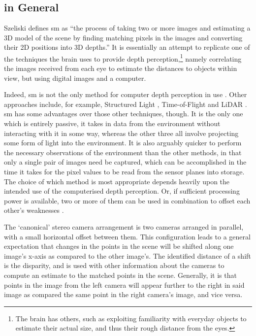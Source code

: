\section{}

\subsection{\label{subsec:smgeneral} in General}
Szeliski defines \gls{sm} \cite[p. 469]{Szeliski2011} as ``the process of taking two or more images and estimating a 3D model of the scene by finding matching pixels in the images and converting their 2D positions into 3D depths.''  It is essentially an attempt to replicate one of the techniques the brain uses to provide depth perception,\footnote{The brain has others, such as exploiting familiarity with everyday objects to estimate their actual size, and thus their rough distance from the eyes.} namely correlating the images received from each eye to estimate the distances to objects within view, but using digital images and a computer.

Indeed, \gls{sm} is not the only method for computer depth perception in use \cite{Sinha2020}.  Other approaches include, for example, Structured Light \cite{Giancola2018}, Time-of-Flight \cite{Hansard2013} and LiDAR \cite{Dong2017}.  \Gls{sm} has some advantages over those other techniques, though.  It is the only one which is entirely passive, \ie{} it takes in data from the environment without interacting with it in some way, whereas the other three all involve projecting some form of light into the environment.  It is also arguably quicker to perform the necessary observations of the environment than the other methods, in that only a single pair of images need be captured, which can be accomplished in the time it takes for the pixel values to be read from the sensor planes into storage.  The choice of which method is most appropriate depends heavily upon the intended use of the computerised depth perception.  Or, if sufficient processing power is available, two or more of them can be used in combination to offset each other's weaknesses \cite{Zanuttigh2016}.

The `canonical' stereo camera arrangement is two cameras arranged in parallel, with a small horizontal offset between them.  This configuration leads to a general expectation that changes in the points in the scene will be shifted along one image's x-axis as compared to the other image's.  The identified distance of a shift is the \gls{disparity}, and is used with other information about the cameras to compute an estimate to the matched points in the scene.  Generally, it is  that points in the image from the left camera will appear further to the right in said image as compared the same point in the right camera's image, and vice versa.

